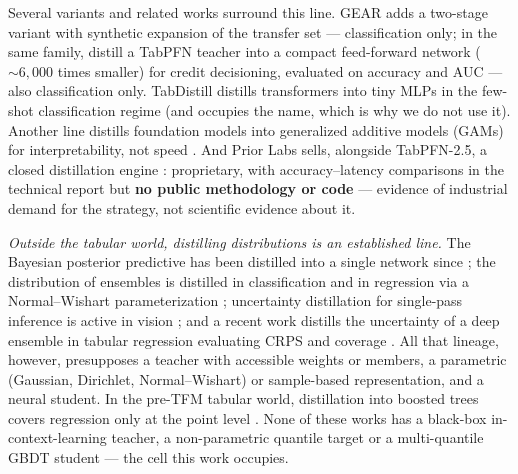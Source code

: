 Several variants and related works surround this line. GEAR \citep{gear2026}
adds a two-stage variant with synthetic expansion of the transfer
set --- classification only; in the same family, \citet{dey2026}
distill a TabPFN teacher into a compact feed-forward network
(${\sim}6{,}000$ times smaller) for credit decisioning,
evaluated on accuracy and AUC --- also classification only.
TabDistill \citep{tabdistill2025} distills transformers into tiny
MLPs in the few-shot classification regime (and occupies the name,
which is why we do not use it). Another line distills foundation
models into generalized additive models (GAMs) for
interpretability, not speed \citep{tfmgam2026}. And Prior Labs
sells, alongside TabPFN-2.5, a closed distillation engine
\citep{priorlabs2025}: proprietary, with accuracy--latency
comparisons in the technical report but \textbf{no public
methodology or code} --- evidence of industrial demand for the
strategy, not scientific evidence about it.

\emph{Outside the tabular world, distilling distributions is an
established line.} The Bayesian posterior predictive has been
distilled into a single network since \citet{korattikara2015}; the
distribution of ensembles is distilled in classification
\citep{malinin2020end2} and in regression via a Normal--Wishart
parameterization \citep{malinin2020rpn}; uncertainty distillation
for single-pass inference is active in vision \citep{shen2021};
and a recent work distills the uncertainty of a deep ensemble in
tabular regression evaluating CRPS and coverage
\citep{park2025uncertainty}. All that lineage, however,
presupposes a teacher with accessible weights or members, a
parametric (Gaussian, Dirichlet, Normal--Wishart) or sample-based
representation, and a neural student. In the pre-TFM tabular
world, distillation into boosted trees covers regression only at
the point level \citep{fakoor2020}. None of these works has a
black-box in-context-learning teacher, a non-parametric quantile
target or a multi-quantile GBDT student --- the cell this work
occupies.

